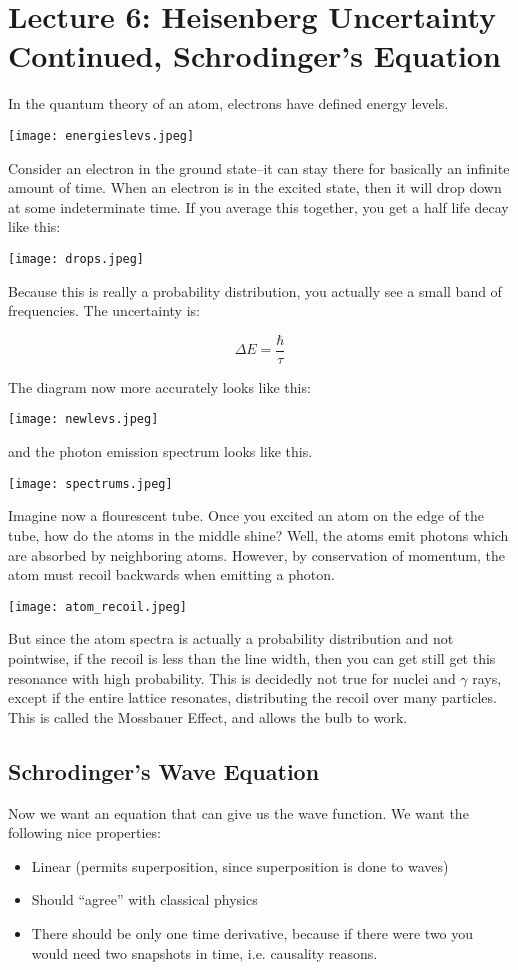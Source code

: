 \section{Lecture 6: Heisenberg Uncertainty Continued, Schrodinger's Equation}

In the quantum theory of an atom, electrons have defined energy levels. 

\texttt{[image: energieslevs.jpeg]}

Consider an electron in the ground state--it can stay
there for basically an infinite amount of time. When an electron is in the excited state, then
it will drop down at some indeterminate time. If you average this together, you get a half life decay like this:

\texttt{[image: drops.jpeg]}

Because this is really a probability distribution, you actually see a small band of frequencies. The uncertainty is:

\[ \Delta E = \frac{\hbar}{\tau} \]

The diagram now more accurately looks like this:

\texttt{[image: newlevs.jpeg]}

and the photon emission spectrum looks like this.

\texttt{[image: spectrums.jpeg]}

Imagine now a flourescent tube. Once you excited an atom on the edge of the tube, how do the atoms in the middle shine?
Well, the atoms emit photons which are absorbed by neighboring atoms. However, by conservation of momentum, the atom must recoil backwards when emitting
a photon.

\texttt{[image: atom\_recoil.jpeg]}

But since the atom spectra is actually a probability distribution and not pointwise, if the recoil is less than the line width, then you can get still get this resonance
with high probability. This is decidedly not true for nuclei and $\gamma$ rays, except if the entire lattice resonates, distributing the recoil over many particles. This is called the Mossbauer Effect,
and allows the bulb to work.

\subsection{Schrodinger's Wave Equation}
Now we want an equation that can give us the wave function. We want the following nice properties:
\begin{itemize}
    \item Linear (permits superposition, since superposition is done to waves)
    \item Should ``agree'' with classical physics
    \item There should be only one time derivative, because if there were two you would need two snapshots in time, i.e. causality reasons.
\end{itemize}

